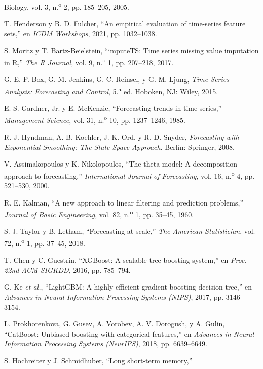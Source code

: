 \documentclass[12pt,letterpaper]{report}
\begin{document}
\begin{enumerate}[label={[\arabic*]}, leftmargin=*, itemsep=2pt]
{Biology}, vol. 3, n.\textsuperscript{o} 2, pp. 185--205, 2005.
\item\label{bib:22} T. Henderson y B. D. Fulcher, ``An empirical evaluation of
time-series feature sets,'' en \textit{ICDM Workshops}, 2021, pp. 1032--1038.
\item\label{bib:23} S. Moritz y T. Bartz-Beielstein, ``imputeTS: Time series missing
value imputation in R,'' \textit{The R Journal}, vol. 9, n.\textsuperscript{o} 1,
pp. 207--218, 2017.
\item\label{bib:24} G. E. P. Box, G. M. Jenkins, G. C. Reinsel, y G. M. Ljung,
\textit{Time Series Analysis: Forecasting and Control}, 5.\textsuperscript{a} ed.
Hoboken, NJ: Wiley, 2015.
\item\label{bib:25} E. S. Gardner, Jr. y E. McKenzie, ``Forecasting trends in time series,'' \textit{Management Science}, vol. 31, n.\textsuperscript{o} 10, pp. 1237--1246, 1985.
\item\label{bib:26} R. J. Hyndman, A. B. Koehler, J. K. Ord, y R. D. Snyder, \textit{Forecasting with Exponential Smoothing: The State Space Approach}. Berlín: Springer, 2008.
\item\label{bib:27} V. Assimakopoulos y K. Nikolopoulos, ``The theta model: A decomposition approach to forecasting,'' \textit{International Journal of Forecasting}, vol. 16, n.\textsuperscript{o} 4, pp. 521--530, 2000.
\item\label{bib:28} R. E. Kalman, ``A new approach to linear filtering and prediction problems,'' \textit{Journal of Basic Engineering}, vol. 82, n.\textsuperscript{o} 1, pp. 35--45, 1960.
\item\label{bib:29} S. J. Taylor y B. Letham, ``Forecasting at scale,'' \textit{The
American Statistician}, vol. 72, n.\textsuperscript{o} 1, pp. 37--45, 2018.
\item\label{bib:30} T. Chen y C. Guestrin, ``XGBoost: A scalable tree boosting
system,'' en \textit{Proc. 22nd ACM SIGKDD}, 2016, pp. 785--794.
\item\label{bib:31} G. Ke \textit{et al.}, ``LightGBM: A highly efficient gradient boosting decision tree,'' en \textit{Advances in Neural Information Processing Systems (NIPS)}, 2017, pp. 3146--3154.
\item\label{bib:32} L. Prokhorenkova, G. Gusev, A. Vorobev, A. V. Dorogush, y A. Gulin, ``CatBoost: Unbiased boosting with categorical features,'' en \textit{Advances in Neural Information Processing Systems (NeurIPS)}, 2018, pp. 6639--6649.
\item\label{bib:33} S. Hochreiter y J. Schmidhuber, ``Long short-term memory,''

\end{enumerate}
\end{document}
